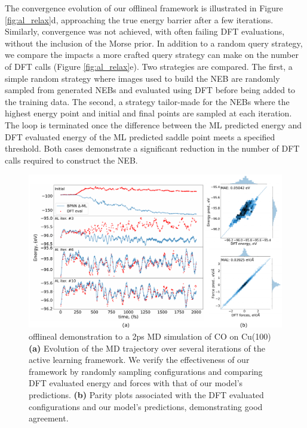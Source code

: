 \documentclass[%
 reprint,
 amsmath,amssymb,
 aps,
]{revtex4-2}
\begin{document}
The convergence evolution of our \gls{offlineal} framework is illustrated in Figure \ref{fig:al_relax}d, approaching the true energy barrier after a few iterations. Similarly, convergence was not achieved, with often failing DFT evaluations, without the inclusion of the Morse prior. In addition to a random query strategy, we compare the impacts a more crafted query strategy can make on the number of DFT calls (Figure \ref{fig:al_relax}e). Two strategies are compared. The first, a simple random strategy where images used to build the NEB are randomly sampled from generated NEBs and evaluated using DFT before being added to the training data. The second, a strategy tailor-made for the NEBs where the highest energy point and initial and final points are sampled at each iteration. The loop is terminated once the difference between the ML predicted energy and DFT evaluated energy of the ML predicted saddle point meets a specified threshold. Both cases demonstrate a significant reduction in the number of DFT calls required to construct the NEB. 

\begin{figure}
    \centering
    \includegraphics[width=\textwidth]{figures/figure_4.pdf}
    \caption{ \gls{offlineal} demonstration to a 2ps MD simulation of CO on Cu(100) \textbf{(a)} Evolution of the MD trajectory over several iterations of the active learning framework. We verify the effectiveness of our framework by randomly sampling configurations and comparing DFT evaluated energy and forces with that of our model's predictions. \textbf{(b)} Parity plots associated with the DFT evaluated configurations and our model's predictions, demonstrating good agreement.
    }
    \label{fig:al_md}
\end{figure}
\end{document}
